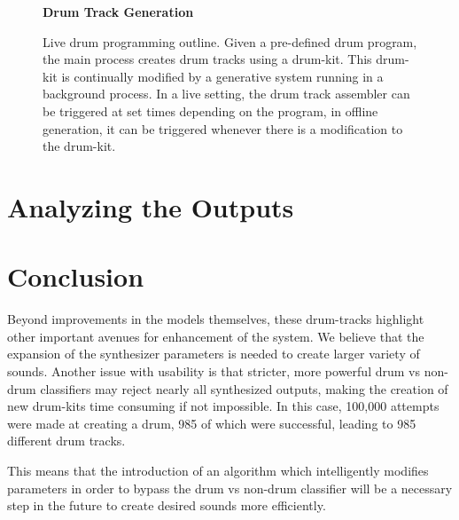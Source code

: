 \documentclass[\main/thesis.tex]{subfiles}
\begin{document}
\begin{figure}[htpb]
    \begin{center}
    \textbf{Drum Track Generation}
    \end{center}
    \caption{Live drum programming outline. Given a pre-defined drum program, the main process creates drum tracks using a drum-kit. This drum-kit is continually modified by a generative system running in a background process. In a live setting, the drum track assembler can be triggered at set times depending on the program, in offline generation, it can be triggered whenever there is a modification to the drum-kit.  }
\label{fig:live_drumming}
\end{figure} 

\section{Analyzing the Outputs}

\section{Conclusion}
Beyond improvements in the models themselves, these drum-tracks highlight other important avenues for enhancement of the system.  We believe that the expansion of the synthesizer parameters is needed to create larger variety of sounds. Another issue  with  usability  is  that  stricter,  more  powerful  drum  vs  non-drum  classifiers may reject nearly all synthesized outputs, making the creation of new drum-kits time consuming if not impossible.  In this case, 100,000 attempts were made at creating a drum,  985 of which were successful, leading to 985 different drum tracks. 

This means that the introduction of an algorithm which intelligently  modifies  parameters  in  order  to  bypass  the  drum  vs  non-drum classifier will be a necessary step in the future to create desired sounds more efficiently.
\end{document}
